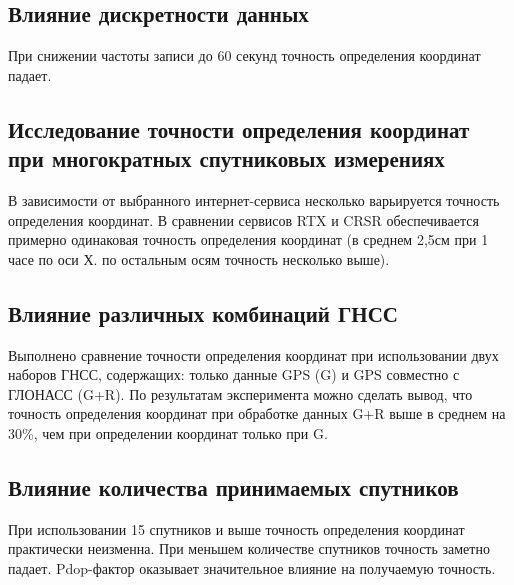\subsection*{Влияние дискретности данных}\label{subsec:ch2/sec4/sub-3}

При снижении частоты записи до 60 секунд точность определения координат падает.

\subsection*{Исследование точности определения координат при многократных спутниковых измерениях}\label{subsec:ch2/sec4/sub-4}

В зависимости от выбранного интернет-сервиса несколько варьируется точность определения координат. В сравнении сервисов RTX и CRSR обеспечивается примерно одинаковая точность определения координат (в среднем 2,5\thinspace см при 1 часе по оси Х. по остальным осям точность несколько выше).

\subsection*{Влияние различных комбинаций ГНСС}\label{subsec:ch2/sec4/sub-5}

Выполнено сравнение точности определения координат при использовании двух наборов ГНСС, содержащих: только данные GPS (G) и GPS совместно с ГЛОНАСС (G+R). По результатам эксперимента можно сделать вывод, что точность определения координат при обработке данных G+R выше в среднем на 30\%, чем при определении координат только при G.

\subsection*{Влияние количества принимаемых спутников}\label{subsec:ch2/sec4/sub-6}

При использовании 15 спутников и выше точность определения координат практически неизменна. При меньшем количестве спутников точность заметно падает. Pdop-фактор оказывает значительное влияние на получаемую точность.




\fi %